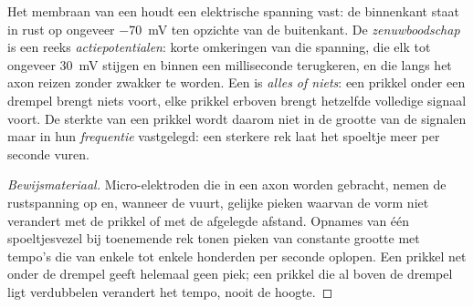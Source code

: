 \begin{proposition}[De actiepotentiaal]\label{prop:g12:stretch-reflex:actionpotential}
Het membraan van een  houdt een elektrische spanning vast: de
binnenkant staat in rust op ongeveer \qty{-70}{mV} ten opzichte van de
buitenkant. De \emph{zenuwboodschap} is een reeks
\emph{actiepotentialen}: korte omkeringen van die
spanning, die elk tot ongeveer \qty{+30}{mV} stijgen en binnen een
milliseconde terugkeren, en die langs het axon reizen zonder zwakker te
worden. Een  is \emph{alles of niets}: een prikkel onder
een drempel brengt niets voort, elke prikkel erboven brengt hetzelfde
volledige signaal voort. De sterkte van een prikkel wordt daarom niet in
de grootte van de signalen maar in hun \emph{frequentie} vastgelegd: een
sterkere rek laat het spoeltje meer  per seconde vuren.
\end{proposition}
\begin{proof}[Bewijsmateriaal]
Micro-elektroden die in een axon worden gebracht, nemen de rustspanning op
en, wanneer de  vuurt, gelijke pieken waarvan de vorm niet verandert
met de prikkel of met de afgelegde afstand. Opnames van één spoeltjesvezel
bij toenemende rek tonen pieken van constante grootte met tempo's die van
enkele tot enkele honderden per seconde oplopen. Een prikkel net onder de
drempel geeft helemaal geen piek; een prikkel die al boven de drempel ligt
verdubbelen verandert het tempo, nooit de hoogte.
\end{proof}


